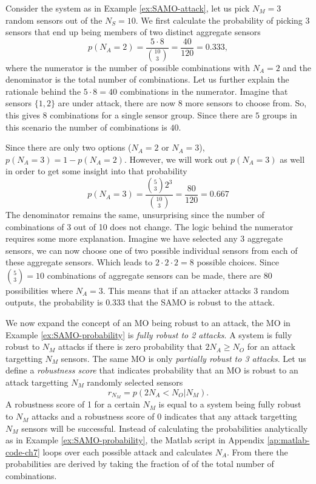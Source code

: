 \begin{example}\label{ex:SAMO-probability}
    Consider the system as in Example \ref{ex:SAMO-attack}, let us pick $N_M=3$ random sensors out of the $N_S=10$. We first calculate the probability of picking $3$ sensors that end up being members of two distinct aggregate sensors
    \begin{equation*}
        p(N_A=2) = \frac{\displaystyle 5 \cdot 8}{\displaystyle  \binom{10}{3}} = \frac{40}{120} = 0.333,
    \end{equation*}
    where the numerator is the number of possible combinations with $N_A=2$ and the denominator is the total number of combinations. Let us further explain the rationale behind the $5 \cdot 8 = 40$ combinations in the numerator. Imagine that sensors $\{1,2\}$ are under attack, there are now $8$ more sensors to choose from. So, this gives $8$ combinations for a single sensor group. Since there are $5$ groups in this scenario the number of combinations is $40$. 
    
    Since there are only two options ($N_A = 2$ or $N_A=3$), $p(N_A=3)=1-p(N_A=2)$. However, we will work out $p(N_A=3)$ as well in order to get some insight into that probability
    \begin{equation*}
        p(N_A=3) = \frac{\displaystyle \binom{5}{3}2^3}{\displaystyle \binom{10}{3}} = \frac{80}{120} = 0.667
    \end{equation*}
    The denominator remains the same, unsurprising since the number of combinations of 3 out of 10 does not change. The logic behind the numerator requires some more explanation. Imagine we have selected any $3$ aggregate sensors, we can now choose one of two possible individual sensors from each of these aggregate sensors. Which leads to $2\cdot2\cdot2=8$ possible choices. Since $\binom{5}{3}=10$ combinations of aggregate sensors can be made, there are $80$ possibilities where $N_A=3$. This means that if an attacker attacks $3$ random outputs, the probability is $0.333$ that the SAMO is robust to the attack.
\end{example}
We now expand the concept of an MO being robust to an attack, the MO in Example \ref{ex:SAMO-probability} is \textit{fully robust to 2 attacks}. A system is fully robust to $N_M$ attacks if there is zero probability that $2N_A \geq N_O$ for an attack targetting $N_M$ sensors. The same MO is only \textit{partially robust to 3 attacks}. Let us define a \textit{robustness score} that indicates probability that an MO is robust to an attack targetting $N_M$ randomly selected sensors
\begin{equation}\label{eqn:robustness-score}
    r_{N_M} = p(2N_A < N_O | N_M).
\end{equation}
A robustness score of 1 for a certain $N_M$ is equal to a system being fully robust to $N_M$ attacks and a robustness score of 0 indicates that any attack targetting $N_M$ sensors will be successful. Instead of calculating the probabilities analytically as in Example \ref{ex:SAMO-probability}, the Matlab script in Appendix \ref{ap:matlab-code-ch7} loops over each possible attack and calculates $N_A$. From there the probabilities are derived by taking the fraction of of the total number of combinations. 

